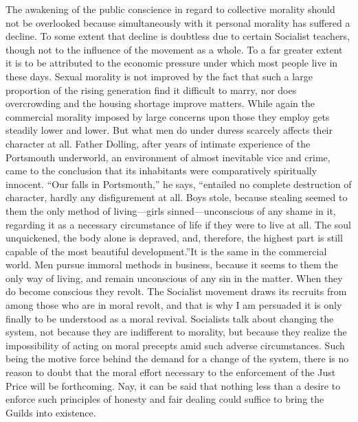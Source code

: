 \documentclass{book}
\begin{document}
The awakening of the public conscience in regard to collective morality should not be overlooked because simultaneously with it personal morality has suffered a decline. To some extent that decline is doubtless due to certain Socialist teachers, though not to the influence of the movement as a whole. To a far greater extent it is to be attributed to the economic pressure under which most people live in these days. Sexual morality is not improved by the fact that such a large proportion of the rising generation find it difficult to marry, nor does overcrowding and the housing shortage improve matters. While again the commercial morality imposed by large concerns upon those they employ gets steadily lower and lower. But what men do under duress scarcely affects their character at all. Father Dolling, after years of intimate experience of the Portsmouth underworld, an environment of almost inevitable vice and crime, came to the conclusion that its inhabitants were comparatively spiritually innocent. “Our falls in Portsmouth,” he says, “entailed no complete destruction of character, hardly any disfigurement at all. Boys stole, because stealing seemed to them the only method of living—girls sinned—unconscious of any shame in it, regarding it as a necessary circumstance of life if they were to live at all. The soul unquickened, the body alone is depraved, and, therefore, the highest part is still capable of the most beautiful development.”\footnotemark[1] It is the same in the commercial world. Men pursue immoral methods in business, because it seems to them the only way of living, and remain unconscious of any sin in the matter. When they do become conscious they revolt. The Socialist movement draws its recruits from among those who are in moral revolt, and that is why I am persuaded it is only finally to be understood as a moral revival. Socialists talk about changing the system, not because they are indifferent to morality, but because they realize the impossibility of acting on moral precepts amid such adverse circumstances. Such being the motive force behind the demand for a change of the system, there is no reason to doubt that the moral effort necessary to the enforcement of the Just Price will be forthcoming. Nay, it can be said that nothing less than a desire to enforce such principles of honesty and fair dealing could suffice to bring the Guilds into existence.
\end{document}

